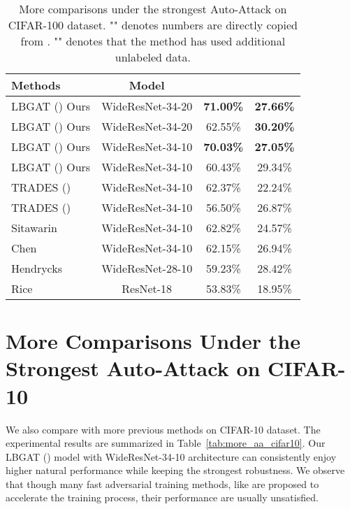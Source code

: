 \documentclass[10pt,twocolumn,letterpaper]{article}
\begin{document}
\vspace{0.2in}
\begin{table*}[h]
	\centering
	\caption{More comparisons under the strongest Auto-Attack on CIFAR-100 dataset. "\dag" denotes numbers are directly copied from \cite{croce2020reliable}. "" denotes that the method has used additional unlabeled data.} 
	\vspace{0.1cm}
	\begin{tabular}{l|c|c|c}
		\textbf{Methods} & Model & & \\
		\hline
		\hline
		LBGAT () Ours                 &WideResNet-34-20 &\textbf{71.00\%} &\textbf{27.66\%} \\
		LBGAT () Ours                 &WideResNet-34-20 &62.55\% &\textbf{30.20\%} \\
		LBGAT () Ours                 &WideResNet-34-10 &\textbf{70.03\%} &\textbf{27.05\%} \\
		LBGAT () Ours                 &WideResNet-34-10 &60.43\% &29.34\% \\
		\hline
		\hline
		
		TRADES () \cite{zhang2019theoretically}      &WideResNet-34-10 &62.37\% &22.24\% \\
		TRADES () \cite{zhang2019theoretically}      &WideResNet-34-10 &56.50\% &26.87\% \\
		Sitawarin \etal \cite{sitawarin2020improving} \dag &WideResNet-34-10 &62.82\%    &24.57\% \\
		Chen \etal \cite{chen2020efficient} \dag           &WideResNet-34-10 &62.15\%	&26.94\% \\ 
		Hendrycks \etal \cite{hendrycks2019using} \dag      &WideResNet-28-10 &59.23\%	&28.42\% \\
		Rice \etal \cite{rice2020overfitting} \dag         &ResNet-18        &53.83\%    &18.95\% \\
		\hline
		\hline
	\end{tabular}
	\label{tab:more_aa_cifar100}
\end{table*}

\newpage
\section{More Comparisons Under the Strongest Auto-Attack on CIFAR-10}
We also compare with more previous methods on CIFAR-10 dataset. The experimental results are summarized in Table~\ref{tab:more_aa_cifar10}. Our LBGAT () model with WideResNet-34-10 architecture can consistently enjoy higher natural performance while keeping the strongest robustness. We observe that though many fast adversarial training methods, like \cite{wang2019bilateral,shafahi2019adversarial} are proposed to accelerate the training process, their performance are usually unsatisfied.
\end{document}
